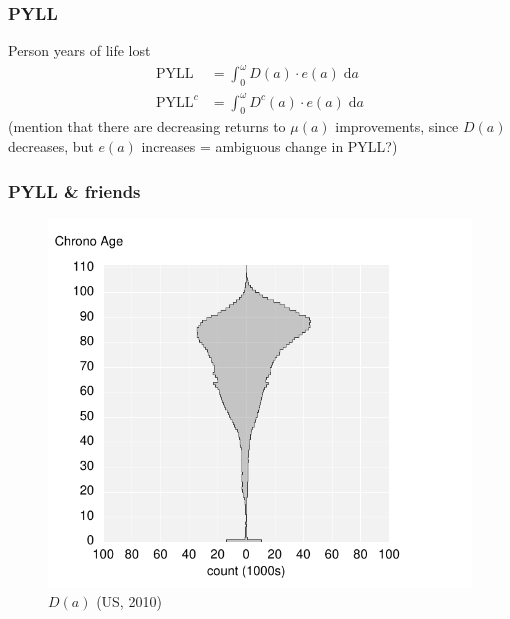 \documentclass{beamer}
\newcommand{\dd}{\; \mathrm{d}}
\begin{document}
\begin{frame}
\frametitle{PYLL}
Person years of life lost
\begin{align}
\text{PYLL} &= \int_0^\omega D(a) \cdot e(a) \dd a \\
\text{PYLL}^c &= \int_0^\omega D^c(a) \cdot e(a) \dd a
\end{align}
(mention that there are decreasing returns to $\mu(a)$ improvements, since
$D(a)$ decreases, but $e(a)$ increases = ambiguous change in PYLL?)
\end{frame}


\begin{frame}
\frametitle{PYLL \& friends}
\vspace{-1cm}
\begin{figure}[b]
    \centering
    \includegraphics[scale=.7]{Figures/f1_Da.pdf}
    \caption{$D(a)$ (US, 2010)}
\end{figure} 
\end{frame}
\end{document}
